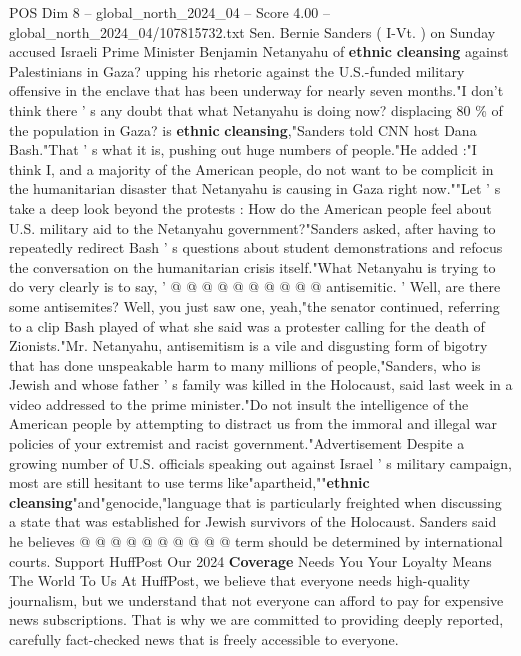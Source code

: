 \begin{textsample}{POS Dim 8 – global\_north\_2024\_04 – Score 4.00 – global\_north\_2024\_04/107815732.txt}  \label{ex:f8_pos_313}
Sen.
Bernie Sanders ( I-Vt. ) on Sunday accused Israeli Prime Minister Benjamin Netanyahu of \textbf{ethnic} \textbf{cleansing} against Palestinians in Gaza? upping his rhetoric against the U.S.-funded military offensive in the enclave that has been underway for nearly seven months."I don't think there ' s any doubt that what Netanyahu is doing now? displacing 80 \% of the population in Gaza? is \textbf{ethnic} \textbf{cleansing},"Sanders told CNN host Dana Bash."That ' s what it is, pushing out huge numbers of people."He added :"I think I, and a majority of the American people, do not want to be complicit in the humanitarian disaster that Netanyahu is causing in Gaza right now.""Let ' s take a deep look beyond the protests : How do the American people feel about U.S. military aid to the Netanyahu government?"Sanders asked, after having to repeatedly redirect Bash ' s questions about student demonstrations and refocus the conversation on the humanitarian crisis itself."What Netanyahu is trying to do very clearly is to say, ' @ @ @ @ @ @ @ @ @ @ antisemitic. ' Well, are there some antisemites?
Well, you just saw one, yeah,"the senator continued, referring to a clip Bash played of what she said was a protester calling for the death of Zionists."Mr.
Netanyahu, antisemitism is a vile and disgusting form of bigotry that has done unspeakable harm to many millions of people,"Sanders, who is Jewish and whose father ' s family was killed in the Holocaust, said last week in a video addressed to the prime minister."Do not insult the intelligence of the American people by attempting to distract us from the immoral and illegal war policies of your extremist and racist government."Advertisement Despite a growing number of U.S. officials speaking out against Israel ' s military campaign, most are still hesitant to use terms like"apartheid,""\textbf{ethnic} \textbf{cleansing}"and"genocide,"language that is particularly freighted when discussing a state that was established for Jewish survivors of the Holocaust.
Sanders said he believes @ @ @ @ @ @ @ @ @ @ term should be determined by international courts.
Support HuffPost Our 2024 \textbf{Coverage} Needs You Your Loyalty Means The World To Us At HuffPost, we believe that everyone needs high-quality journalism, but we understand that not everyone can afford to pay for expensive news subscriptions.
That is why we are committed to providing deeply reported, carefully fact-checked news that is freely accessible to everyone.

\end{textsample}
